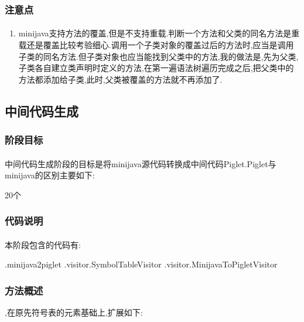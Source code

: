 \documentclass[11pt, oneside]{article}   	%
\begin{document}
\begin{spacing}{1.55}
	\subsubsection{注意点}
	\paragraph{}
	\begin{enumerate}
	,所以在判断类型是否一致时,不能简单判断两者类型是否完全一样
	,建议切断循环圈中任一一个继承关系,以防止后面的代码陷入死循环
	\item minijava支持方法的覆盖,但是不支持重载.判断一个方法和父类的同名方法是重载还是覆盖比较考验细心.调用一个子类对象的覆盖过后的方法时,应当是调用子类的同名方法.但子类对象也应当能找到父类中的方法,我的做法是,先为父类,子类各自建立类声明时定义的方法,在第一遍语法树遍历完成之后,把父类中的方法都添加给子类,此时,父类被覆盖的方法就不再添加了.
	\end{enumerate}
	
	\subsection{中间代码生成}
	\subsubsection{阶段目标}
	\paragraph{}
	中间代码生成阶段的目标是将minijava源代码转换成中间代码Piglet.Piglet与minijava的区别主要如下:
	\begin{enumerate}
	20个
	\end{enumerate}
	\subsubsection{代码说明}
	\paragraph{}
	本阶段包含的代码有:
	\begin{enumerate}
	.minijava2piglet
	.visitor.SymbolTableVisitor
	.visitor.MinijavaToPigletVisitor
	\end{enumerate}
	\subsubsection{方法概述}
	\begin{enumerate}
	,在原先符号表的元素基础上,扩展如下:

\end{enumerate}
\end{spacing}
\end{document}
